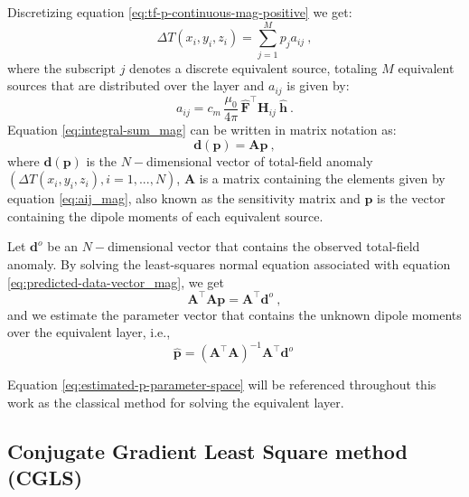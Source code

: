 Discretizing equation \ref{eq:tf-p-continuous-mag-positive} we get:
\begin{equation}
\Delta T(x_{i}, y_{i}, z_{i}) = \sum_{j=1}^{M} p_j a_{ij}\: ,
\label{eq:integral-sum_mag}
\end{equation}
where the subscript $j$ denotes a discrete equivalent source, totaling $M$ equivalent sources 
that are distributed over the layer and $a_{ij}$ is given by:
\begin{equation}
a_{ij}
= c_{m} \, \frac{\mu_{0}}{4\pi} \, \hat{\mathbf{F}}^{\top} \mathbf{H}_{ij} \: \hat{\mathbf{h}} \: .
\label{eq:aij_mag}
\end{equation}
Equation \ref{eq:integral-sum_mag} can be written in matrix notation as:
\begin{equation}
\mathbf{d}(\mathbf{p}) = \mathbf{A} \mathbf{p} \: ,
\label{eq:predicted-data-vector_mag}
\end{equation}
where $\mathbf{d}(\mathbf{p})$ is the $N-$dimensional vector of total-field anomaly 
$(\Delta T(x_i, y_i, z_i), i =  1,...,N)$, $\mathbf{A}$ is a matrix containing the elements given by equation \ref{eq:aij_mag}, also known as the sensitivity matrix and $\mathbf{p}$ is the vector containing the dipole moments of each equivalent source. 

Let $\mathbf{d}^{o}$ be an $N-$dimensional vector that contains the observed total-field anomaly.
By solving the least-squares normal equation associated with equation \ref{eq:predicted-data-vector_mag}, 
we get
\begin{equation}
	\mathbf{A}^{\top}\mathbf{A}{\mathbf{p}} = 
	\mathbf{A}^{\top} \mathbf{d}^{o} \: ,
	\label{eq:normal-equations}
\end{equation} 
and we estimate the parameter vector that contains the unknown dipole moments over the equivalent layer, i.e.,
\begin{equation}
\hat{\mathbf{p}} = \left( \mathbf{A}^{\top}\mathbf{A} %
\right)^{-1}
\mathbf{A}^{\top} \mathbf{d}^{o} \:
\label{eq:estimated-p-parameter-space}
\end{equation}

Equation \ref{eq:estimated-p-parameter-space} will be referenced throughout this work as the classical method for solving the equivalent layer.

\subsection{Conjugate Gradient Least Square method (CGLS)}

